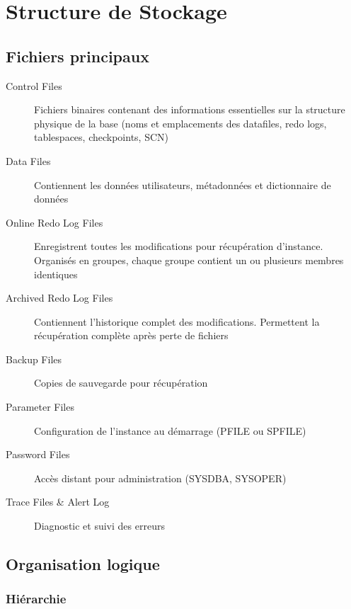 \documentclass[12pt,a4paper]{article}
\begin{document}
\section{Structure de Stockage}

\subsection{Fichiers principaux}

\begin{description}
    \item[Control Files] Fichiers binaires contenant des informations essentielles sur la structure physique de la base (noms et emplacements des datafiles, redo logs, tablespaces, checkpoints, SCN)
    
    \item[Data Files] Contiennent les données utilisateurs, métadonnées et dictionnaire de données
    
    \item[Online Redo Log Files] Enregistrent toutes les modifications pour récupération d'instance. Organisés en groupes, chaque groupe contient un ou plusieurs membres identiques
    
    \item[Archived Redo Log Files] Contiennent l'historique complet des modifications. Permettent la récupération complète après perte de fichiers
    
    \item[Backup Files] Copies de sauvegarde pour récupération
    
    \item[Parameter Files] Configuration de l'instance au démarrage (PFILE ou SPFILE)
    
    \item[Password Files] Accès distant pour administration (SYSDBA, SYSOPER)
    
    \item[Trace Files \& Alert Log] Diagnostic et suivi des erreurs
\end{description}

\subsection{Organisation logique}

\subsubsection{Hiérarchie}
\end{document}
